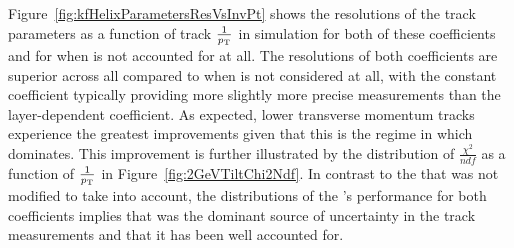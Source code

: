 \begin{table}[htbp]
\label{tab:trackFindingPerformance2GeVKF}
\centering
\end{table}

Figure~\ref{fig:kfHelixParametersResVsInvPt} shows the resolutions of the track parameters as a function of track $\frac{1}{p_{\mathrm{T}}}$ in simulation for both of these \MS coefficients and for when \MS is not accounted for at all.
The resolutions of both \MS coefficients are superior across all \pt compared to when \MS is not considered at all, with the constant \MS coefficient typically providing more slightly more precise measurements than the layer-dependent coefficient.  
As expected, lower transverse momentum tracks experience the greatest improvements given that this is the regime in which \MS dominates.
This improvement is further illustrated by the distribution of $\frac{\chi^{2}}{ndf}$ as a function of $\frac{1}{p_{\mathrm{T}}}$ in Figure~\ref{fig:2GeVTiltChi2Ndf}.
In contrast to the \KF that was not modified to take \MS into account, the distributions of the \KF's performance for both \MS coefficients implies that \MS was the dominant source of uncertainty in the track measurements and that it has been well accounted for.

